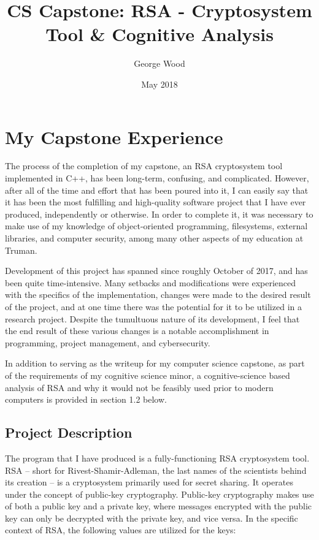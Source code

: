 \documentclass[11pt]{article}
\title{CS Capstone: RSA - Cryptosystem Tool \& Cognitive Analysis }
\author{George Wood}
\date{May 2018}
\begin{document}
\maketitle

\thispagestyle{empty}

\section{My Capstone Experience}
The process of the completion of my capstone, an RSA cryptosystem tool implemented in C++, has been long-term, confusing, and complicated. However, after all of the time and effort that has been poured into it, I can easily say that it has been the most fulfilling and high-quality software project that I have ever produced, independently or otherwise. In order to complete it, it was necessary to make use of my knowledge of object-oriented programming, filesystems, external libraries, and computer security, among many other aspects of my education at Truman.

Development of this project has spanned since roughly October of 2017, and has been quite time-intensive. Many setbacks and modifications were experienced with the specifics of the implementation, changes were made to the desired result of the project, and at one time there was the potential for it to be utilized in a research project. Despite the tumultuous nature of its development, I feel that the end result of these various changes is a notable accomplishment in programming, project management, and cybersecurity.

In addition to serving as the writeup for my computer science capstone, as part of the requirements of my cognitive science minor, a cognitive-science based analysis of RSA and why it would not be feasibly used prior to modern computers is provided in section 1.2 below. 

\subsection{Project Description}
The program that I have produced is a fully-functioning RSA cryptosystem tool. RSA -- short for Rivest-Shamir-Adleman, the last names of the scientists behind its creation -- is a cryptosystem primarily used for secret sharing. It operates under the concept of public-key cryptography. Public-key cryptography makes use of both a public key and a private key, where messages encrypted with the public key can only be decrypted with the private key, and vice versa. In the specific context of RSA, the following values are utilized for the keys:
\end{document}
